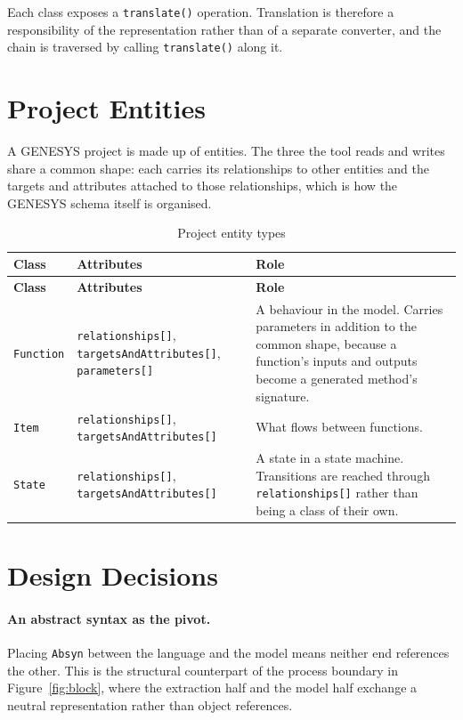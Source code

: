 Each class exposes a \texttt{translate()} operation. Translation is therefore a
responsibility of the representation rather than of a separate converter, and
the chain is traversed by calling \texttt{translate()} along it.

\section{Project Entities}

A GENESYS project is made up of entities. The three the tool reads and writes
share a common shape: each carries its relationships to other entities and the
targets and attributes attached to those relationships, which is how the GENESYS
schema itself is organised.

\begin{longtable}{L{0.18\textwidth}L{0.30\textwidth}L{0.44\textwidth}}
	\caption{Project entity types}\label{tab:entities}\\
	\toprule
	\textbf{Class} & \textbf{Attributes} & \textbf{Role} \\
	\midrule
	\endfirsthead
	\toprule
	\textbf{Class} & \textbf{Attributes} & \textbf{Role} \\
	\midrule
	\endhead

	\texttt{Function} & \texttt{relationships[]}, \texttt{targetsAndAttributes[]},
	\texttt{parameters[]}
	& A behaviour in the model. Carries parameters in addition to the common
	shape, because a function's inputs and outputs become a generated method's
	signature. \\
	\addlinespace

	\texttt{Item} & \texttt{relationships[]}, \texttt{targetsAndAttributes[]}
	& What flows between functions. \\
	\addlinespace

	\texttt{State} & \texttt{relationships[]}, \texttt{targetsAndAttributes[]}
	& A state in a state machine. Transitions are reached through
	\texttt{relationships[]} rather than being a class of their own. \\
	\bottomrule
\end{longtable}

\section{Design Decisions}

\paragraph{An abstract syntax as the pivot.}
Placing \texttt{Absyn} between the language and the model means neither end
references the other. This is the structural counterpart of the process boundary
in Figure~\ref{fig:block}, where the extraction half and the model half exchange
a neutral representation rather than object references.

